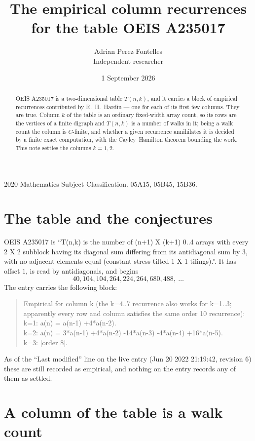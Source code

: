\documentclass[11pt,a4paper]{article}
\title{The empirical column recurrences for the table OEIS A235017}
\author{Adrian Perez Fontelles\\ \small Independent researcher}
\date{1 September 2026}
\theoremstyle{plain}
\theoremstyle{definition}
\begin{document}
\maketitle

\begin{abstract}
OEIS A235017 is a two-dimensional table $T(n,k)$, and it carries a block of empirical
recurrences contributed by R.~H.~Hardin --- one for each of its first few columns. They are
true. Column $k$ of the table is an ordinary fixed-width array count, so its rows are the
vertices of a finite digraph and $T(n,k)$ is a number of walks in it; being a walk count the
column is $C$-finite, and whether a given recurrence annihilates it is decided by a finite
exact computation, with the Cayley--Hamilton theorem bounding the work. This note settles the
columns $k=1, 2$.
\end{abstract}

\noindent\small 2020 Mathematics Subject Classification. 05A15, 05B45, 15B36.\normalsize

\section{The table and the conjectures}

OEIS A235017 is ``T(n,k) is the number of (n+1) X (k+1) 0..4 arrays with every 2 X 2 subblock having its diagonal sum differing from its antidiagonal sum by 3, with no adjacent elements equal (constant-stress tilted 1 X 1 tilings).''. It has offset $1$, is
read by antidiagonals, and begins
\[
40, 104, 104, 264, 224, 264, 680, 488,\ \dots
\]
The entry carries the following block:
\begin{quote}\small
Empirical for column k (the k=4..7 recurrence also works for k=1..3; apparently every row and column satisfies the same order 10 recurrence):\\
k=1: a(n) = a(n-1) +4*a(n-2).\\
k=2: a(n) = 3*a(n-1) +4*a(n-2) -14*a(n-3) -4*a(n-4) +16*a(n-5).\\
k=3: [order 8].\\
\end{quote}
As of the ``Last modified'' line on the live entry (Jun 20 2022 21:19:42, revision 6) these are still
recorded as empirical, and nothing on the entry records any of them as settled.

\section{A column of the table is a walk count}
\end{document}
